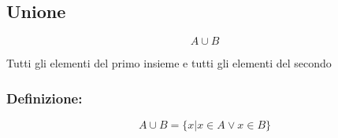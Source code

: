 \documentclass{article}
\begin{document}
\subsection{Unione}
    \begin{LARGE}
        \begin{equation*}
            A \cup B
        \end{equation*}
    \end{LARGE}
    Tutti gli elementi del primo insieme e tutti gli elementi del secondo\newline
    
    \subsubsection*{Definizione:}
    
    \begin{LARGE}
        \begin{equation*}
            A \cup B = \{x | x \in A \vee x \in B\}
        \end{equation*}
    \end{LARGE}
\end{document}
